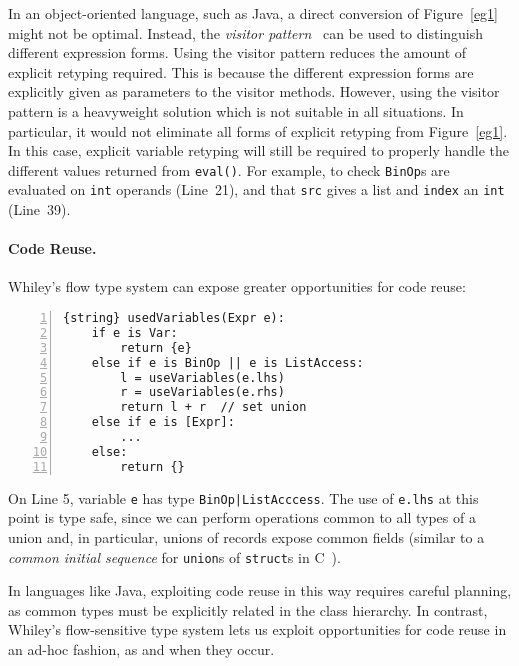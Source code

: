 In an object-oriented language, such as Java, a direct conversion of
Figure~\ref{eg1} might not be optimal.  Instead, the {\em visitor
  pattern}~\cite{gofbook} can be used to distinguish different
expression forms.  Using the visitor pattern reduces the amount of
explicit retyping required.  This is because the different expression
forms are explicitly given as parameters to the visitor methods.
However, using the visitor pattern is a heavyweight solution which is
not suitable in all situations.  In particular, it would not eliminate
all forms of explicit retyping from Figure~\ref{eg1}.  In this case,
explicit variable retyping will still be required to properly handle
the different values returned from \lstinline{eval()}.  For example,
to check \lstinline{BinOp}s are evaluated on \lstinline{int} operands
(Line~21), and that \lstinline{src} gives a list and \lstinline{index}
an \lstinline{int} (Line~39).



\paragraph{Code Reuse.}
Whiley's flow type system can expose greater opportunities
for code reuse:
\begin{lstlisting}[numbers=left]
{string} usedVariables(Expr e):
    if e is Var:
        return {e}
    else if e is BinOp || e is ListAccess:
        l = useVariables(e.lhs)
        r = useVariables(e.rhs)
        return l + r  // set union
    else if e is [Expr]:
        ...
    else:
        return {}
\end{lstlisting}

On Line 5, variable \lstinline{e} has type
\lstinline{BinOp|ListAcccess}.  The use of \lstinline{e.lhs} at this
point is type safe, since we can perform operations common to all
types of a union and, in particular, unions of records expose common
fields (similar to a {\em common initial sequence} for
\lstinline{union}s of \lstinline{struct}s in
C~\cite[\S6.3.2.3]{ISO90}).

In languages like Java, exploiting code reuse in this way requires
careful planning, as common types must be explicitly related in the
class hierarchy.  In contrast, Whiley's flow-sensitive type system
lets us exploit opportunities for code reuse in an ad-hoc fashion, as
and when they occur.



